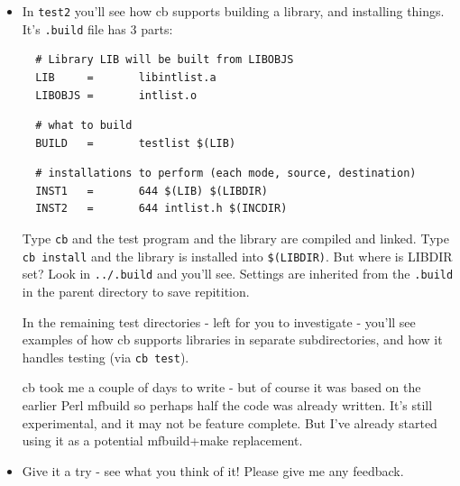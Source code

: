 \documentclass[aspectratio=169]{beamer}
\begin{document}
\begin{frame}[fragile]
  \begin{itemize}

  \item
  In \verb+test2+ you'll see how \alert{cb} supports building a library,
  and installing things.  It's \verb+.build+ file has 3 parts:

\tiny
\begin{verbatim}
  # Library LIB will be built from LIBOBJS
  LIB     =       libintlist.a
  LIBOBJS =       intlist.o
\end{verbatim}

\pause
\begin{verbatim}
  # what to build
  BUILD   =       testlist $(LIB)
\end{verbatim}

\pause
\begin{verbatim}
  # installations to perform (each mode, source, destination)
  INST1   =       644 $(LIB) $(LIBDIR)
  INST2   =       644 intlist.h $(INCDIR)
\end{verbatim}
\small

  \pitem
  Type \verb+cb+ and the test program and the library are compiled
  and linked.  Type \verb+cb install+ and the library is installed
  into \verb+$(LIBDIR)+.  But where is LIBDIR set?  Look in
  \verb+../.build+ and you'll see.  Settings are inherited from
  the \verb+.build+ in the parent directory to save repitition.

  \pitem
  In the remaining test directories - left for you to investigate -
  you'll see examples of how \alert{cb} supports libraries in separate
  subdirectories,
  and how it handles testing (via \verb+cb test+).

  \pitem
  \alert{cb} took me a couple of days to write - but of course it was
  based on the earlier Perl \alert{mfbuild} so perhaps half the code
  was already written.  It's still experimental, and it may not be
  feature complete.  But I've already started using it
  as a potential \alert{mfbuild+make} replacement.
  
  \item
  Give it a try - see what you think of it!  Please give me any feedback.

  \end{itemize}
\end{frame}
\end{document}
